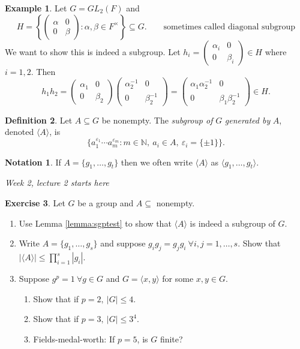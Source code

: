 \documentclass[a4paper]{article}
\theoremstyle{definition}
\newtheorem{defn}{Definition}[subsection]
\newtheorem{example}[defn]{Example}
\newtheorem{exe}[defn]{Exercise}
\newtheorem*{notation}{Notation}
\begin{document}
\begin{example}
Let $G=GL_2(F)$ and
\[
H=\left\{\begin{pmatrix}
  \alpha & 0 \\ 0 & \beta
\end{pmatrix}:\alpha,\beta\in F^{\times}\right\} \subseteq G. \qquad\text{sometimes called diagonal subgroup}
\]
We want to show this is indeed a subgroup. Let $h_i=\begin{pmatrix}
  \alpha_i & 0 \\ 0 & \beta_i
\end{pmatrix}\in H$ where $i=1,2$. Then
\[
h_1h_2=\begin{pmatrix}
  \alpha_1 & 0 \\ 0 & \beta_2
\end{pmatrix}\begin{pmatrix}
  \alpha_2^{-1} & 0 \\ 0 & \beta_2^{-1}
\end{pmatrix}=\begin{pmatrix}
  \alpha_1 \alpha_2^{-1} & 0 \\ 0 & \beta_1\beta_2^{-1}
\end{pmatrix}\in H .
\]
\end{example}
\begin{defn}
Let $A\subseteq G$ be nonempty. The \textit{subgroup of} $G$ \textit{generated by} $A$, denoted $\langle A\rangle$, is
\[
\{a_1^{\varepsilon_1}\cdots a_m^{\varepsilon_m}:m\in\mathbb N,\ a_i\in A,\ \varepsilon_i=\{\pm 1\}\}.
\]
\end{defn}
\begin{notation}
If $A=\{g_1,\ldots,g_t\}$ then we often write $\langle A\rangle$ as $\langle g_1,\ldots,g_t\rangle$.
\end{notation}

\begin{flushright}
\textit{Week 2, lecture 2 starts here}
\end{flushright}

\begin{exe}
Let $G$ be a group and $A\subseteq$ nonempty.
\begin{enumerate}
\item Use Lemma \ref{lemma:sgptest} to show that $\langle A\rangle$ is indeed a subgroup of $G$.
\item Write $A=\{g_1,\ldots,g_s\}$ and suppose $g_ig_j=g_jg_i \ \forall i,j=1,\ldots,s$. Show that $|\langle A\rangle|\leq \prod_{i=1}^s |g_i|$.
\item Suppose $g^p=1 \ \forall g\in G$ and $G=\langle x,y\rangle$ for some $x,y\in G$.
\begin{enumerate}
\item Show that if $p=2,\ |G|\leq 4$.
\item Show that if $p=3,\ |G|\leq 3^4$.
\item Fields-medal-worth: If $p=5$, is $G$ finite?
\end{enumerate}
\end{enumerate}
\end{exe}
\end{document}

